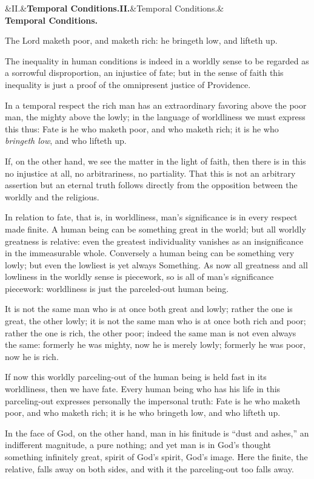 \documentclass[12pt,a4paper,openany]{book}
\newcommand{\opage}[1]{\marginnote{\footnotesize\textit{[#1]}}}
\newcommand{\stykke}[2]{\begin{center}\ifx&#1&\textbf{#2}\else\textbf{#1}\ifx&#2&\else\\[0.2em]\textbf{#2}\fi\fi\end{center}}
\begin{document}
\stykke{II.}{Temporal Conditions.}

The Lord maketh poor, and maketh rich:
he bringeth low, and lifteth up.

The inequality in human conditions is indeed
in a worldly sense to be regarded as a sorrowful
disproportion, an injustice of fate;
but in the sense of faith this inequality
\setcounter{footnote}{0}%
\opage{56}is just a proof of the omnipresent justice of Providence.

In a temporal respect the rich man has an extraordinary  %
favoring above the poor man, the
mighty above the lowly; in the
language of worldliness we must express this thus: Fate is he who maketh poor, and who
maketh rich; it is he who \emph{bringeth low}, and who lifteth up.

If, on the other hand, we see the matter in the light of faith, then
there is in this no injustice at all, no arbitrariness,
no partiality. That this is not
an arbitrary assertion but an eternal truth
follows directly from the opposition between the
worldly and the religious.

In relation to fate, that is, in worldliness,
man's significance is in every respect
made finite. A human being can be something great in the world; but all worldly greatness
is relative: even the greatest individuality
vanishes as an insignificance in the immeasurable
whole. Conversely a human being can be
something very lowly; but even the lowliest
is yet always Something. As now all greatness and all
lowliness in the worldly sense is piecework, so is
\setcounter{footnote}{0}%
\opage{57}all of man's significance piecework: worldliness
is just the parceled-out human being.

It is not the same man who is at once
both great and lowly; rather the one is great,
the other lowly; it is not the same man who
is at once both rich and poor; rather the
one is rich, the other poor; indeed the same man
is not even always the same: formerly he was
mighty, now he is merely lowly; formerly he was
poor, now he is rich.

If now this worldly parceling-out of the human being
is held fast in its worldliness, then we
have fate. Every human being who has his
life in this parceling-out expresses personally the
impersonal truth: Fate is he who
maketh poor, and who maketh rich; it is he
who bringeth low, and who lifteth up.

In the face of God, on the other hand, man in
his finitude is ``dust and ashes,'' an indifferent
magnitude, a pure nothing; and yet man is
in God's thought something infinitely great, spirit of
God's spirit, God's image. Here the finite, the relative, falls away
on both sides,
and with it the parceling-out too falls away.
\end{document}
